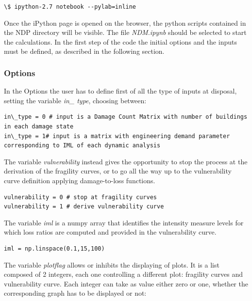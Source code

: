 \begin{Verbatim}[frame=single, commandchars=\\\{\}, samepage=true]
\$ ipython-2.7 notebook --pylab=inline
\end{Verbatim}

Once the iPython page is opened on the browser, the python scripts contained in the NDP directory will be visible. The file \textit{NDM.ipynb} should be selected to start the calculations.
In the first step of the code the initial options and the inputs must be defined, as described in the following section.

\subsubsection{Options}
In the Options the user has to define first of all the type of inputs at disposal, setting the variable \textit{in\_ type}, choosing between:

\begin{Verbatim}[frame=single, commandchars=\\\{\}, samepage=true]
in\_type = 0 # input is a Damage Count Matrix with number of buildings in each damage state
in\_type = 1# input is a matrix with engineering demand parameter corresponding to IML of each dynamic analysis
\end{Verbatim}

The variable \textit{vulnerability} instead gives the opportunity to stop the process at the derivation of the fragility curves, or to go all the way up to the vulnerability curve definition applying damage-to-loss functions.

\begin{Verbatim}[frame=single, commandchars=\\\{\}, samepage=true]
vulnerability = 0 # stop at fragility curves
vulnerability = 1 # derive vulnerability curve
\end{Verbatim}

The variable \textit{iml} is a numpy array that identifies the intensity measure levels for which loss ratios are computed and provided in the vulnerability curve.

\begin{Verbatim}[frame=single, commandchars=\\\{\}, samepage=true]
iml = np.linspace(0.1,15,100)
\end{Verbatim}

The variable \textit{plotflag} allows or inhibits the displaying of plots. It is a list composed of 2 integers, each one controlling a different plot: fragility curves and vulnerability curve. Each integer can take as value either zero or one, whether the corresponding graph has to be displayed or not:

